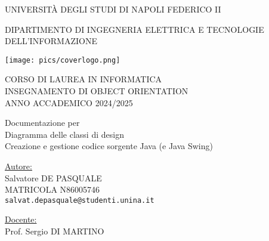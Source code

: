 \documentclass[a4paper, 12pt]{article}
\begin{document}
\begin{titlepage}
    {
        \centering      %
        \scshape        %

        {\large {\LARGE U}NIVERSITÀ DEGLI STUDI DI {\LARGE N}APOLI {\LARGE F}EDERICO II\par}
        \vspace{0.25cm}

        {\small DIPARTIMENTO DI INGEGNERIA ELETTRICA E TECNOLOGIE DELL'INFORMAZIONE\par}
    }

    \vspace{1cm}

    \centering
    {
    \texttt{[image: pics/coverlogo.png]}
    }

    \vspace{1cm}

    {
        \centering
        \scshape
        CORSO DI LAUREA IN INFORMATICA \\[0.5cm]
        INSEGNAMENTO DI OBJECT ORIENTATION \\[0.5cm]
        ANNO ACCADEMICO 2024/2025 \\
    }

    \vfill

    {
        \centering %
        \Large\bfseries

        Documentazione per \\[1cm]
        Diagramma delle classi di design\\[1cm]
        Creazione e gestione codice sorgente Java (e Java Swing)
    }

    \vfill 

    \begin{minipage}[t]{0.4\textwidth}
        \flushleft
        \underline{Autore:}\\[0.3cm]
        Salvatore DE PASQUALE \\
        MATRICOLA N86005746 \\
        \texttt{salvat.depasquale@studenti.unina.it} \\[0.5cm] %
    \end{minipage}
    \hfill
    \begin{minipage}[t]{0.4\textwidth}
        \flushleft
        \underline{Docente:}\\[0.3cm]
        Prof. Sergio DI MARTINO
    \end{minipage}

\end{titlepage}
\end{document}
